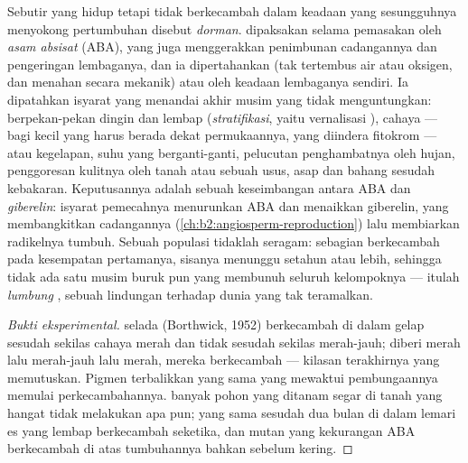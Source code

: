 \begin{definition}\label{def:b2:plant-flowering:dormancy}
Sebutir  yang hidup tetapi tidak berkecambah dalam keadaan yang
sesungguhnya menyokong pertumbuhan disebut \emph{dorman}. 
dipaksakan selama pemasakan  oleh \emph{asam absisat} (ABA),
yang juga menggerakkan penimbunan cadangannya dan pengeringan
lembaganya, dan ia dipertahankan  (tak tertembus air atau
oksigen, dan menahan secara mekanik) atau oleh keadaan lembaganya
sendiri. Ia dipatahkan isyarat yang menandai akhir musim yang tidak
menguntungkan: berpekan-pekan dingin dan lembap (\emph{stratifikasi},
yaitu vernalisasi ), cahaya --- bagi  kecil yang harus
berada dekat permukaannya, yang diindera fitokrom --- atau kegelapan,
suhu yang berganti-ganti, pelucutan penghambatnya oleh hujan,
penggoresan kulitnya oleh tanah atau sebuah usus, asap dan bahang
sesudah kebakaran. Keputusannya adalah sebuah keseimbangan antara ABA
dan \emph{giberelin}: isyarat pemecahnya menurunkan ABA dan menaikkan
giberelin, yang membangkitkan cadangannya
(\cref{ch:b2:angiosperm-reproduction}) lalu membiarkan radikelnya
tumbuh. Sebuah populasi  tidaklah seragam: sebagian berkecambah
pada kesempatan pertamanya, sisanya menunggu setahun atau lebih,
sehingga tidak ada satu musim buruk pun yang membunuh seluruh
kelompoknya --- itulah \emph{lumbung }, sebuah lindungan terhadap
dunia yang tak teramalkan.
\end{definition}
\begin{proof}[Bukti eksperimental]
 selada (Borthwick, 1952) berkecambah di dalam gelap sesudah
sekilas cahaya merah dan tidak sesudah sekilas merah-jauh; diberi merah
lalu merah-jauh lalu merah, mereka berkecambah --- kilasan terakhirnya
yang memutuskan. Pigmen terbalikkan yang sama yang mewaktui
pembungaannya memulai perkecambahannya.  banyak pohon yang ditanam
segar di tanah yang hangat tidak melakukan apa pun;  yang sama
sesudah dua bulan di dalam lemari es yang lembap berkecambah seketika,
dan mutan yang kekurangan ABA berkecambah di atas tumbuhannya bahkan
sebelum  kering.
\end{proof}

